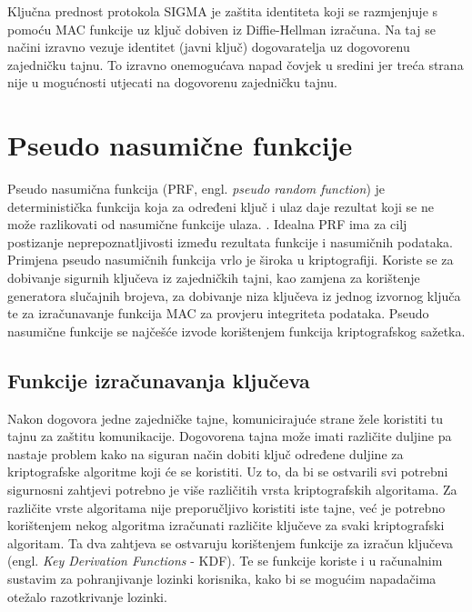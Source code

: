 Ključna prednost protokola SIGMA je zaštita identiteta koji se razmjenjuje s
pomoću MAC funkcije uz ključ dobiven iz Diffie-Hellman izračuna. Na taj se
načini izravno vezuje identitet (javni ključ) dogovaratelja uz dogovorenu
zajedničku tajnu. To izravno onemogućava napad čovjek u sredini jer treća
strana nije u mogućnosti utjecati na dogovorenu zajedničku tajnu.

\section{Pseudo nasumične funkcije}

Pseudo nasumična funkcija (PRF, engl. \emph{pseudo random function}) je
deterministička funkcija koja za određeni ključ i ulaz daje rezultat koji se ne
može razlikovati od nasumične funkcije ulaza.
\cite[str. 994]{van2011encyclopedia}. Idealna PRF ima za cilj postizanje
neprepoznatljivosti između rezultata funkcije i nasumičnih podataka. 
Primjena pseudo nasumičnih funkcija vrlo je
široka u kriptografiji. Koriste se za dobivanje sigurnih ključeva iz
zajedničkih tajni, kao zamjena za korištenje generatora slučajnih brojeva,
za dobivanje niza ključeva iz jednog izvornog ključa te za izračunavanje
funkcija MAC za provjeru integriteta podataka. Pseudo nasumične funkcije se
najčešće izvode korištenjem funkcija kriptografskog sažetka.

\subsection{Funkcije izračunavanja ključeva}
Nakon dogovora jedne zajedničke tajne, komunicirajuće strane žele koristiti tu
tajnu za zaštitu komunikacije. Dogovorena tajna može imati različite duljine pa
nastaje problem kako na siguran način dobiti ključ određene duljine za
kriptografske algoritme koji će se koristiti. Uz to, da bi se ostvarili svi
potrebni sigurnosni zahtjevi potrebno je više različitih vrsta kriptografskih
algoritama. Za različite vrste algoritama nije preporučljivo koristiti iste
tajne, već je potrebno korištenjem nekog algoritma izračunati različite ključeve za
svaki kriptografski algoritam. Ta dva zahtjeva se ostvaruju korištenjem funkcije za
izračun ključeva (engl. \emph{Key Derivation Functions} - KDF). Te se funkcije
koriste i u računalnim sustavim za pohranjivanje lozinki korisnika, kako bi se
mogućim napadačima otežalo razotkrivanje lozinki.

